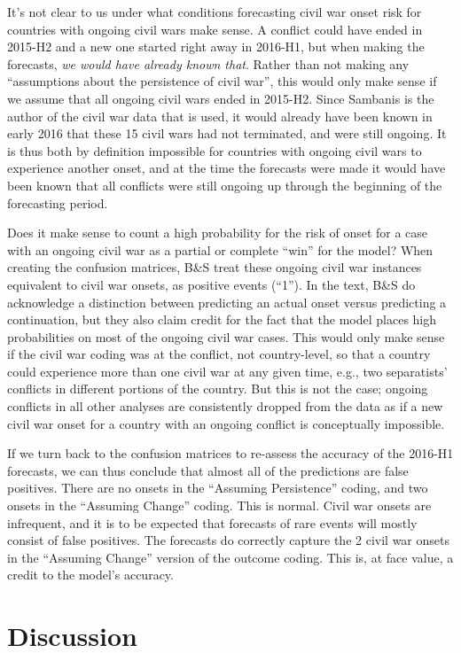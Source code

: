 \documentclass[
]{article}
\begin{document}
It's not clear to us under what conditions forecasting civil war onset risk for countries with ongoing civil wars make sense. A
conflict could have ended in 2015-H2 and a new one started right away in 2016-H1, but when making the forecasts, \emph{we would have already known that}. Rather than not making any ``assumptions about the persistence of civil war'', this would only make sense if we assume that all ongoing civil wars ended in 2015-H2. Since Sambanis is the author of the civil war data that is used, it would already have been known in early 2016 that these 15 civil wars had not terminated, and were still ongoing. It is thus both by definition impossible for countries with ongoing civil wars to experience another onset, and at the time the forecasts were made it would have been known that all conflicts were still ongoing up through the beginning of the forecasting period.

Does it make sense to count a high probability for the risk of onset for a case with an ongoing civil war as a partial or complete ``win'' for the model? When creating the confusion matrices, B\&S treat these ongoing civil war instances equivalent to civil war onsets, as positive events (``1''). In the text, B\&S do acknowledge a distinction between predicting an actual onset versus predicting a continuation, but they also claim credit for the fact that the model places high probabilities on most of the ongoing civil war cases. This would only make sense if the civil war coding was at the conflict, not country-level, so that a country could experience more than one civil war at any given time, e.g., two separatists' conflicts in different portions of the country. But this is not the case; ongoing conflicts in all other analyses are consistently dropped from the data as if a new civil war onset for a country with an ongoing conflict is conceptually impossible.

If we turn back to the confusion matrices to re-assess the accuracy of the 2016-H1 forecasts, we can thus conclude that almost all of the predictions are false positives. There are no onsets in the ``Assuming Persistence'' coding, and two onsets in the ``Assuming Change'' coding. This is normal. Civil war onsets are infrequent, and it is to be expected that forecasts of rare events will mostly consist of false positives. The forecasts do correctly capture the 2 civil war onsets in the ``Assuming Change'' version of the outcome coding. This is, at face value, a credit to the model's accuracy.

\hypertarget{discussion}{%
\section{Discussion}\label{discussion}}
\end{document}
